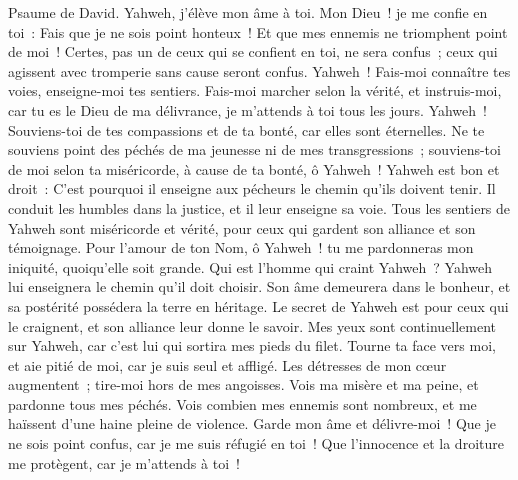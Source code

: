 \begin{multicols}{2}
\VerseOne{}Psaume de David.  Yahweh, j'élève mon âme à toi.
 Mon Dieu~! je me confie en toi~: Fais que je ne sois point honteux~! Et que mes ennemis ne triomphent point de moi~!
 Certes, pas un de ceux qui se confient en toi, ne sera confus~; ceux qui agissent avec tromperie sans cause seront confus.
 Yahweh~! Fais-moi connaître tes voies, enseigne-moi tes sentiers.
 Fais-moi marcher selon la vérité, et instruis-moi, car tu es le Dieu de ma délivrance, je m'attends à toi tous les jours.
 Yahweh~! Souviens-toi de tes compassions et de ta bonté, car elles sont éternelles.
 Ne te souviens point des péchés de ma jeunesse ni de mes transgressions~; souviens-toi de moi selon ta miséricorde, à cause de ta bonté, ô Yahweh~!
 Yahweh est bon et droit~: C'est pourquoi il enseigne aux pécheurs le chemin qu'ils doivent tenir.
 Il conduit les humbles dans la justice, et il leur enseigne sa voie.
 Tous les sentiers de Yahweh sont miséricorde et vérité, pour ceux qui gardent son alliance et son témoignage.
 Pour l'amour de ton Nom, ô Yahweh~! tu me pardonneras mon iniquité, quoiqu'elle soit grande.
 Qui est l'homme qui craint Yahweh~? Yahweh lui enseignera le chemin qu'il doit choisir.
 Son âme demeurera dans le bonheur, et sa postérité possédera la terre en héritage.
 Le secret de Yahweh est pour ceux qui le craignent, et son alliance leur donne le savoir.
 Mes yeux sont continuellement sur Yahweh, car c'est lui qui sortira mes pieds du filet.
 Tourne ta face vers moi, et aie pitié de moi, car je suis seul et affligé.
 Les détresses de mon cœur augmentent~; tire-moi hors de mes angoisses.
 Vois ma misère et ma peine, et pardonne tous mes péchés.
 Vois combien mes ennemis sont nombreux, et me haïssent d'une haine pleine de violence.
 Garde mon âme et délivre-moi~! Que je ne sois point confus, car je me suis réfugié en toi~!
 Que l'innocence et la droiture me protègent, car je m'attends à toi~!

\end{multicols}

